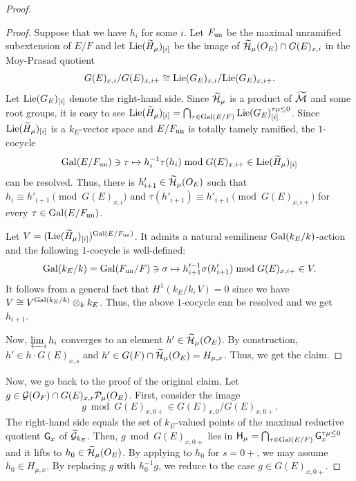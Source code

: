 \documentclass[12pt,reqno]{amsart}
\begin{document}
\begin{proof}
\begin{proof}
    Suppose that we have $h_i$ for some $i$. Let $F_{\operatorname{un}}$ be the maximal unramified subextension of $E / F$ and let ${\operatorname{Lie}}({\widetilde{H}}_\mu)_{[i]}$ be the image of ${\widetilde{{\mathcal{H}}}}_\mu(O_E) \cap G(E)_{x, i}$ in the Moy-Prasad quotient 
    \[
        G(E)_{x, i} / G(E)_{x, i+} \cong {\operatorname{Lie}}(G_E)_{x, i} / {\operatorname{Lie}}(G_E)_{x, i+}. 
    \]
    Let ${\operatorname{Lie}}(G_E)_{[i]}$ denote the right-hand side. Since ${\widetilde{{\mathcal{H}}}}_\mu$ is a product of ${\widetilde{{\mathcal{M}}}}$ and some root groups, it is easy to see ${\operatorname{Lie}}({\widetilde{H}}_\mu)_{[i]} = \bigcap_{\tau \in {\operatorname{Gal}}(E / F)} {\operatorname{Lie}}(G_E)_{[i]}^{\tau\mu \leq 0}$. Since ${\operatorname{Lie}}({\widetilde{H}}_\mu)_{[i]}$ is a $k_E$-vector space and $E / F_{\operatorname{un}}$ is totally tamely ramified, the $1$-cocycle
    \[
        {\operatorname{Gal}}(E / F_{\operatorname{un}}) \ni \tau \mapsto h_i^{-1} \tau(h_i) \bmod{G(E)_{x,i+}} \in {\operatorname{Lie}}({\widetilde{H}}_\mu)_{[i]}
    \]
    can be resolved. Thus, there is $h_{i + 1}'\in {\widetilde{{\mathcal{H}}}}_\mu(O_E)$ such that $h_i \equiv h'_{i+1} \pmod{G(E)_{x, i}}$ and $\tau(h'_{i+1}) \equiv h'_{i+1} \pmod{G(E)_{x, i+}}$ for every $\tau \in {\operatorname{Gal}}(E / F_{\operatorname{un}})$. 
    
    Let $V = ({\operatorname{Lie}}({\widetilde{H}}_\mu)_{[i]})^{{\operatorname{Gal}}(E / F_{\operatorname{un}})}$. It admits a natural semilinear ${\operatorname{Gal}}(k_E/k)$-action and the following $1$-cocycle is well-defined:
    \[
        {\operatorname{Gal}}(k_E / k) = {\operatorname{Gal}}(F_{\operatorname{un}} / F) \ni \sigma \mapsto h'^{-1}_{i+1} \sigma(h'_{i+1}) \bmod{G(E)_{x,i+}} \in V. 
    \]
    It follows from a general fact that $H^1(k_E / k, V) = 0$ since we have $V \cong V^{{\operatorname{Gal}}(k_E / k)} \otimes_k k_E$. Thus, the above $1$-cocycle can be resolved and we get $h_{i + 1}$. 

    Now, $\varprojlim_i h_i$ converges to an element $h' \in {\widetilde{{\mathcal{H}}}}_\mu(O_E)$. By construction, $h' \in h \cdot G(E)_{x, s}$ and  $h' \in G(F) \cap {\widetilde{{\mathcal{H}}}}_\mu(O_E) = H_{\mu, x}$. Thus, we get the claim. 
\end{proof}

    Now, we go back to the proof of the original claim. Let $g \in {\mathcal{G}}(O_F) \cap G(E)_{x, r} {\mathcal{P}}_{\mu}(O_E)$. First, consider the image 
    \[
        g \bmod G(E)_{x, 0+} \in G(E)_{x, 0} / G(E)_{x, 0+}. 
    \]
    The right-hand side equals the set of $k_E$-valued points of the maximal reductive quotient ${\mathsf{G}}_x$ of ${\mathcal{{\widetilde{G}}}}_{k_E}$. Then, $g \bmod G(E)_{x, 0+}$ lies in ${\mathsf{H}}_\mu = \bigcap_{\tau \in {\operatorname{Gal}}(E / F)} {\mathsf{G}}_x^{\tau\mu \leq 0}$ and it lifts to $h_0 \in {\widetilde{{\mathcal{H}}}}_\mu(O_E)$. By applying  to $h_0$ for $s = 0+$, we may assume $h_0 \in H_{\mu, x}$. By replacing $g$ with $h_0^{-1}g$, we reduce to the case $g \in G(E)_{x, 0+}$. 


\end{proof}
\end{document}
